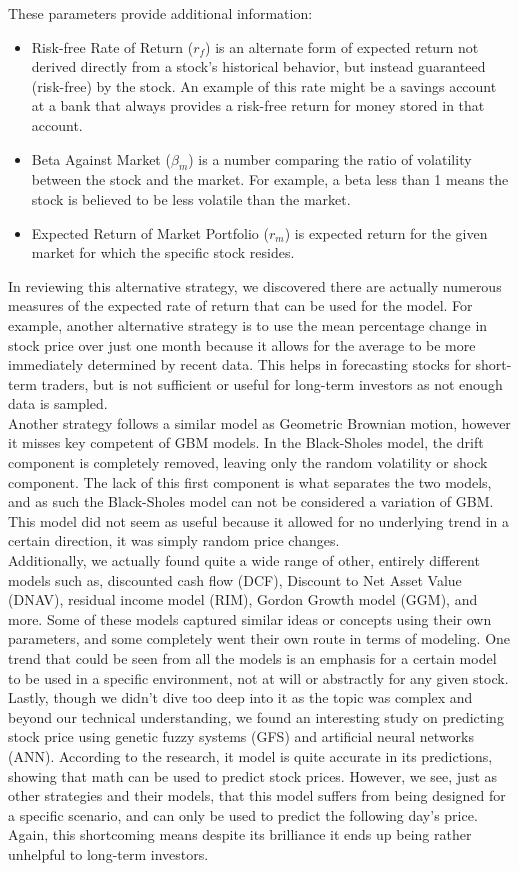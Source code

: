 \documentclass{article}
\begin{document}
\noindent These parameters provide additional information:
\begin{itemize}
\item Risk-free Rate of Return ($r_{f}$) is an alternate form of expected return not derived directly from a stock's historical behavior, but instead guaranteed (risk-free) by the stock. An example of this rate might be a savings account at a bank that always provides a risk-free return for money stored in that account.
\item Beta Against Market ($\beta_{m}$) is a number comparing the ratio of volatility between the stock and the market. For example, a beta less than 1 means the stock is believed to be less volatile than the market.
\item Expected Return of Market Portfolio ($r_{m}$) is expected return for the given market for which the specific stock resides.
\end{itemize}
In reviewing this alternative strategy, we discovered there are actually numerous measures of the expected rate of return that can be used for the model. For example, another alternative strategy is to use the mean percentage change in stock price over just one month because it allows for the average to be more immediately determined by recent data. This helps in forecasting stocks for short-term traders, but is not sufficient or useful for long-term investors as not enough data is sampled. \cite{ApplicationGBM}\\
Another strategy follows a similar model as Geometric Brownian motion, however it misses key competent of GBM models. In the Black-Sholes model, the drift component is completely removed, leaving only the random volatility or shock component. The lack of this first component is what separates the two models, and as such the Black-Sholes model can not be considered a variation of GBM. This model did not seem as useful because it allowed for no underlying trend in a certain direction, it was simply random price changes.\\
Additionally, we actually found quite a wide range of other, entirely different models such as, discounted cash flow (DCF), Discount to Net Asset Value (DNAV), residual income model (RIM), Gordon Growth model (GGM), and more. Some of these models captured similar ideas or concepts using their own parameters, and some completely went their own route in terms of modeling. One trend that could be seen from all the models is an emphasis for a certain model to be used in a specific environment, not at will or abstractly for any given stock.\\
Lastly, though we didn't dive too deep into it as the topic was complex and beyond our technical understanding, we found an interesting study on predicting stock price using genetic fuzzy systems (GFS) and artificial neural networks (ANN). According to the research, it model is quite accurate in its predictions, showing that math can be used to predict stock prices. However, we see, just as other strategies and their models, that this model suffers from being designed for a specific scenario, and can only be used to predict the following day's price. Again, this shortcoming means despite its brilliance it ends up being rather unhelpful to long-term investors. \cite{GFSandANN}
\end{document}
